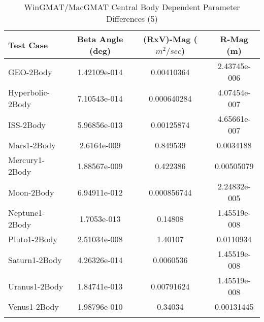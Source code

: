 \begin{table}[htbp!]
\centering
\caption{ WinGMAT/MacGMAT Central Body Dependent Parameter Differences (5)}
      \begin{tabular}{lccc}
      \hline\hline
          Test Case & Beta Angle (deg) & (RxV)-Mag ($m^2/sec$) & R-Mag (m) \\
         \hline
         GEO-2Body & 1.42109e-014 & 0.00410364 & 2.43745e-006 \\
         Hyperbolic-2Body & 7.10543e-014 & 0.000640284 & 4.07454e-007 \\
         ISS-2Body & 5.96856e-013 & 0.00125874 & 4.65661e-007 \\
         Mars1-2Body & 2.6164e-009 & 0.849539 & 0.0034188 \\
         Mercury1-2Body & 1.88567e-009 & 0.422386 & 0.00505079 \\
         Moon-2Body & 6.94911e-012 & 0.000856744 & 2.24832e-005 \\
         Neptune1-2Body & 1.7053e-013 & 0.14808 & 1.45519e-008 \\
         Pluto1-2Body & 2.51034e-008 & 1.40107 & 0.0110934 \\
         Saturn1-2Body & 4.26326e-014 & 0.0060536 & 1.45519e-008 \\
         Uranus1-2Body & 1.84741e-013 & 0.00791624 & 1.45519e-008 \\
         Venus1-2Body & 1.98796e-010 & 0.34034 & 0.00131445 \\
      \hline\hline
      \label{Table: WinGMAT-MacGMAT CB Parameters Set 5} 
\end{tabular}
\end{table}
